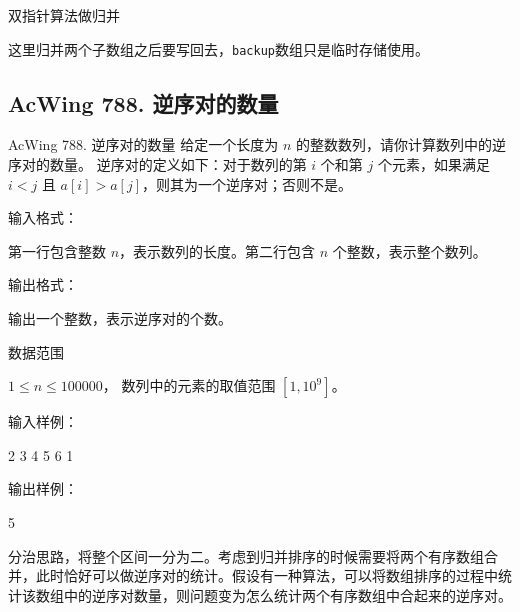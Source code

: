 双指针算法做归并

\begin{keypoint}
    这里归并两个子数组之后要写回去，\lstinline{backup}数组只是临时存储使用。
\end{keypoint}

\subsection{AcWing 788. 逆序对的数量}
\begin{titledbox}{AcWing 788. 逆序对的数量}
    给定一个长度为 $n$ 的整数数列，请你计算数列中的逆序对的数量。
    逆序对的定义如下：对于数列的第 $i$ 个和第 $j$ 个元素，如果满足 $i < j$ 且 $a[i] > a[j]$，则其为一个逆序对；否则不是。
    
    输入格式：

    第一行包含整数 $n$，表示数列的长度。第二行包含 $n$ 个整数，表示整个数列。
    
    输出格式：
    
    输出一个整数，表示逆序对的个数。

    数据范围

    $1 \le n \le 100000$，
    数列中的元素的取值范围 $[1,10^9]$。
    
    输入样例：

    2 3 4 5 6 1
    
    输出样例：
    
    5
\end{titledbox}

分治思路，将整个区间一分为二。考虑到归并排序的时候需要将两个有序数组合并，此时恰好可以做逆序对的统计。假设有一种算法，可以将数组排序的过程中统计该数组中的逆序对数量，则问题变为怎么统计两个有序数组中合起来的逆序对。

